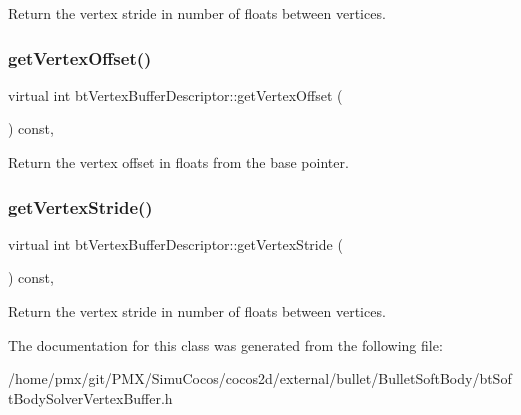 Return the vertex stride in number of floats between vertices. \mbox{\label{classbtVertexBufferDescriptor_a4aa0eefd247d63f25f142ffaa5203768}} 
\subsubsection{\texorpdfstring{get\+Vertex\+Offset()}{getVertexOffset()}}
{\footnotesize\ttfamily virtual int bt\+Vertex\+Buffer\+Descriptor\+::get\+Vertex\+Offset (\begin{DoxyParamCaption}{ }\end{DoxyParamCaption}) const\hspace{0.3cm}{\ttfamily [inline]}, {\ttfamily [virtual]}}

Return the vertex offset in floats from the base pointer. \mbox{\label{classbtVertexBufferDescriptor_af6dd3dc1695b1837d5706337d659a60e}} 
\subsubsection{\texorpdfstring{get\+Vertex\+Stride()}{getVertexStride()}}
{\footnotesize\ttfamily virtual int bt\+Vertex\+Buffer\+Descriptor\+::get\+Vertex\+Stride (\begin{DoxyParamCaption}{ }\end{DoxyParamCaption}) const\hspace{0.3cm}{\ttfamily [inline]}, {\ttfamily [virtual]}}

Return the vertex stride in number of floats between vertices. 

The documentation for this class was generated from the following file\+:\begin{DoxyCompactItemize}
\item 
/home/pmx/git/\+P\+M\+X/\+Simu\+Cocos/cocos2d/external/bullet/\+Bullet\+Soft\+Body/bt\+Soft\+Body\+Solver\+Vertex\+Buffer.\+h\end{DoxyCompactItemize}
